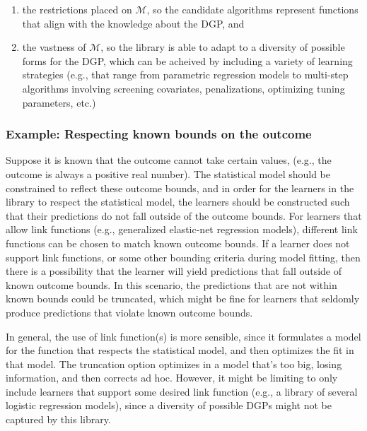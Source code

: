 \documentclass[
  12pt, krantz2,
]{krantz}
\providecommand{\tightlist}{%
  \setlength{\itemsep}{0pt}\setlength{\parskip}{0pt}}
\newcommand{\1}{\mathbbm{1}}
\theoremstyle{definition}
\theoremstyle{definition}
\theoremstyle{definition}
\theoremstyle{definition}
\theoremstyle{remark}
\begin{document}
\begin{enumerate}
\def\labelenumi{\arabic{enumi}.}
\tightlist
\item
  the restrictions placed on \(\mathcal{M}\), so the candidate algorithms
  represent functions that align with the knowledge about the DGP, and
\item
  the vastness of \(\mathcal{M}\), so the library is able to adapt to a
  diversity of possible forms for the DGP, which can be acheived by including
  a variety of learning strategies (e.g., that range from parametric regression
  models to multi-step algorithms involving screening covariates,
  penalizations, optimizing tuning parameters, etc.)
\end{enumerate}

\hypertarget{example-respecting-known-bounds-on-the-outcome}{%
\subsubsection{Example: Respecting known bounds on the outcome}\label{example-respecting-known-bounds-on-the-outcome}}

Suppose it is known that the outcome cannot take certain values,
(e.g., the outcome is always a positive real number). The statistical model
should be constrained to reflect these outcome bounds, and in order for the
learners in the library to respect the statistical model, the learners should
be constructed such that their predictions do not fall outside of the outcome
bounds. For learners that allow link functions (e.g., generalized elastic-net
regression models), different link functions can be chosen to match known
outcome bounds. If a learner does not support link functions, or some other
bounding criteria during model fitting, then there is a possibility that the
learner will yield predictions that fall outside of known outcome bounds. In
this scenario, the predictions that are not within known bounds could be
truncated, which might be fine for learners that seldomly produce predictions
that violate known outcome bounds.

In general, the use of link function(s) is more sensible, since it formulates a
model for the function that respects the statistical model, and then optimizes
the fit in that model. The truncation option optimizes in a model that's too
big, losing information, and then corrects ad hoc. However, it might be
limiting to only include learners that support some desired link function
(e.g., a library of several logistic regression models), since a diversity of
possible DGPs might not be captured by this library.
\end{document}

